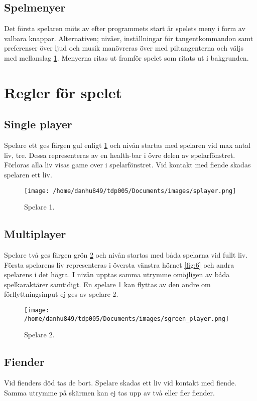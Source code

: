 \documentclass{TDP005mall}
\begin{document}
\subsection{Spelmenyer}
Det första spelaren möts av efter programmets start är spelets meny i form av valbara knappar. Alternativen; nivåer, inställningar för tangentkommandon samt preferenser över ljud och musik manövreras över med piltangenterna och väljs med mellanslag \ref{fig:4}. Menyerna ritas ut framför spelet som ritats ut i bakgrunden.

\newpage

\section{Regler för spelet}%

\subsection{Single player}
 Spelare ett ges färgen gul enligt \ref{fig:4} och nivån startas med spelaren vid max antal liv, tre. Dessa representeras av en health-bar i övre delen av spelarfönstret. Förloras alla liv visas game over i spelarfönstret. Vid kontakt med fiende skadas spelaren ett liv.

\begin{figure}[h!]
  \texttt{[image: /home/danhu849/tdp005/Documents/images/splayer.png]}
  \caption{Spelare 1.\label{fig:4}}
\end{figure}

\subsection{Multiplayer}
Spelare två ges färgen grön \ref{fig:5} och nivån startas med båda spelarna vid fullt liv. Första spelarens liv representeras i översta vänstra hörnet \ref{fig:6} och andra spelarens i det högra. I nivån upptas samma utrymme omöjligen av båda spelkaraktärer samtidigt. En spelare 1 kan flyttas av den andre om förflyttningsinput ej ges av spelare 2.

\begin{figure}[h!]
  \texttt{[image: /home/danhu849/tdp005/Documents/images/sgreen\_player.png]}
  \caption{Spelare 2.\label{fig:5}}
\end{figure}

\subsection{Fiender}
Vid fienders död tas de bort. Spelare skadas ett liv vid kontakt med fiende. Samma utrymme på skärmen kan ej tas upp av två eller fler fiender.
\newpage
\end{document}
